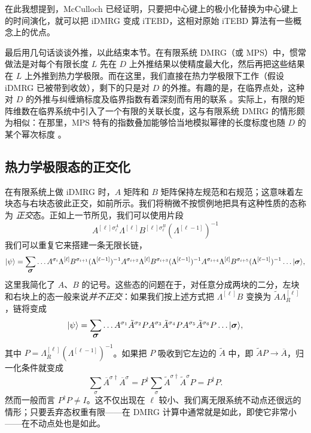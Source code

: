 \documentclass[a4paper,10pt,oneside,onecolumn,1p,times]{elsarticle}
\newcommand{\ket}[1]{\mbox{$| #1  \rangle$}}
\newcommand{\fat}[1]{\mbox{\boldmath$#1$\unboldmath}}	%
\begin{document}
在此我想提到，McCulloch\cite{McCulloch08} 已经证明，只要把中心键上的极小化替换为中心键上的时间演化，就可以把 iDMRG 变成 iTEBD，这相对原始 iTEBD 算法有一些概念上的优点。

最后用几句话谈谈外推，以此结束本节。在有限系统 DMRG（或 MPS）中，惯常做法是对每个有限长度 $L$ 先在 $D$ 上外推结果以使精度最大化，然后再把这些结果在 $L$ 上外推到热力学极限。而在这里，我们直接在热力学极限下工作（假设 iDMRG 已被带到收敛），剩下的只是对 $D$ 的外推。有趣的是，在临界点处，这种对 $D$ 的外推与纠缠熵标度及临界指数有着深刻而有用的联系 \cite{Tagliacozzo08}。实际上，有限的矩阵维数在临界系统中引入了一个有限的关联长度，这与有限系统 DMRG 的情形颇为相似：在那里，MPS 特有的指数叠加能够恰当地模拟幂律的长度标度也随 $D$ 的某个幂次标度 \cite{Andersson99}。

\subsection{热力学极限态的正交化}

在有限系统上做 iDMRG 时，$A$ 矩阵和 $B$ 矩阵保持左规范和右规范；这意味着左块态与右块态彼此正交，如前所示。我们将稍微不按惯例地把具有这种性质的态称为 {\em 正交}态。正如上一节所见，我们可以使用片段
\begin{equation}
A^{[\ell]\sigma_\ell^A}\Lambda^{[\ell]} B^{[\ell]\sigma_\ell^B} (\Lambda^{[\ell-1]})^{-1}
\end{equation}
我们可以重复它来搭建一条无限长链，
\begin{equation}
\ket{\psi} = \sum_{\fat{\sigma}} \ldots A^{\sigma_i}\Lambda^{[\ell]} B^{\sigma_{i+1}} (\Lambda^{[\ell-1]})^{-1}A^{\sigma_{i+2}}\Lambda^{[\ell]} B^{\sigma_{i+3}} (\Lambda^{[\ell-1]})^{-1}A^{\sigma_{i+4}}\Lambda^{[\ell]} B^{\sigma_{i+5}} (\Lambda^{[\ell-1]})^{-1} \ldots \ket{\fat{\sigma}} ,
\end{equation}
这里我简化了 $A$、$B$ 的记号。这些态的问题在于，对任意分成两块的二分，左块和右块上的态一般来说{\em 并不正交}：如果我们按上述方式把 $\Lambda^{[\ell]} B$ 变换为 $\tilde{A} \Lambda_R^{[\ell]}$，链将变成
\begin{equation}
\ket{\psi} = \sum_{\fat{\sigma}} \ldots A^{\sigma_1}\tilde{A}^{\sigma_{2}} P
A^{\sigma_{3}} \tilde{A}^{\sigma_{4}} P A^{\sigma_{5}}\tilde{A}^{\sigma_{6}} P \ldots \ket{\fat{\sigma}} ,
\end{equation}
其中 $P= \Lambda_R^{[\ell]} (\Lambda^{[\ell-1]})^{-1}$。如果把 $P$ 吸收到它左边的 $\tilde{A}$ 中，即 $\tilde{A}P \rightarrow \overline{A}$，归一化条件就变成
\begin{equation}
\sum_\sigma \overline{A}^{\sigma\dagger} \overline{A}^{\sigma} = P^\dagger \sum_\sigma \tilde{A}^{\sigma\dagger} \tilde{A}^\sigma P = P^\dagger P.
\end{equation}
然而一般而言 $P^\dagger P \neq I$。这不仅出现在 $\ell$ 较小、我们离无限系统不动点还很远的情形；只要丢弃态权重有限——在 DMRG 计算中通常就是如此，即使它非常小——在不动点处也是如此。
\end{document}
